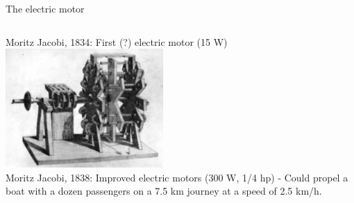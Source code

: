 \begin{frame}{The electric motor}
\begin{columns}
\begin{column}{0.60\textwidth}
\begin{center}
{\begin{center}
            Moritz Jacobi, 1834:
            First (?) electric motor (15 W)\\
            \vspace{0.2cm}
            \includegraphics[width=0.45\textwidth]{./images/photos/electric_motor_improved_jacobi_1838.jpg}\\
            Moritz Jacobi, 1838:
            Improved electric motors (300 W, 1/4 hp) - Could propel a boat with a dozen passengers on a 7.5 km
            journey at a speed of 2.5 km/h.\\
     \end{center}
   }
     \end{center}
  \end{column}
\end{columns}


\end{frame}


%
%
%

